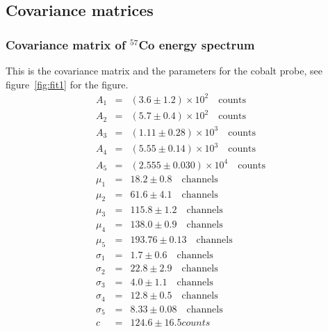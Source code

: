 \subsection{Covariance matrices}
\subsubsection{Covariance matrix of $^{57}$Co energy spectrum}
\label{subs:covariance}
This is the covariance matrix and the parameters for the cobalt probe, see
figure~\ref{fig:fit1} for the figure.
   \begin{align*}
    A_1 &=& \left(3.6 \pm 1.2\right) \times 10^{2} \quad \mathrm{counts}\\
    A_2 &=& \left(5.7 \pm 0.4\right) \times 10^{2} \quad \mathrm{counts}\\
    A_3 &=& \left(1.11 \pm 0.28\right) \times 10^{3} \quad \mathrm{counts}\\
    A_4 &=& \left(5.55 \pm 0.14\right) \times 10^{3} \quad \mathrm{counts}\\
    A_5 &=& \left(2.555 \pm 0.030\right) \times 10^{4} \quad \mathrm{counts}\\
    \mu_1 &=& 18.2 \pm 0.8 \quad \mathrm{channels}\\
    \mu_2 &=& 61.6 \pm 4.1 \quad \mathrm{channels}\\
    \mu_3 &=& 115.8 \pm 1.2 \quad \mathrm{channels}\\
    \mu_4 &=& 138.0 \pm 0.9 \quad \mathrm{channels}\\
    \mu_5 &=& 193.76 \pm 0.13 \quad \mathrm{channels}\\ \sigma_1 &=& 1.7 \pm 0.6 \quad \mathrm{channels}\\ \sigma_2 &=& 22.8 \pm 2.9 \quad \mathrm{channels}\\ \sigma_3 &=& 4.0 \pm 1.1 \quad \mathrm{channels}\\
    \sigma_4 &=& 12.8 \pm 0.5 \quad \mathrm{channels}\\
    \sigma_5 &=& 8.33 \pm 0.08 \quad \mathrm{channels}\\
    c &=& 124.6 \pm 16.5 counts
    \end{align*}
\tiny
